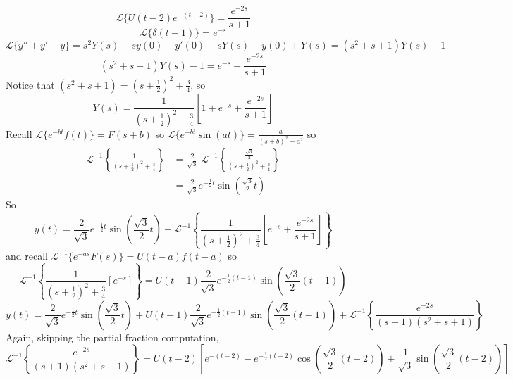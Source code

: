 \documentclass[11pt]{article}
\newcommand{\lap}{\mathcal{L}}
\newcommand{\lapi}{\lap^{-1}}
\begin{document}
		$$ \lap\{ U(t-2) e^{-(t-2)} \} = \frac{e^{-2s}}{s+1} $$
		$$ \lap\{ \delta(t - 1) \} = e^{-s} $$
		$$ \lap\{ y'' + y' + y \} = s^2 Y(s) - sy(0) - y'(0) + s Y(s) - y(0) + Y(s) = (s^2 + s + 1) Y(s) - 1 $$
		$$ (s^2 + s + 1) Y(s) - 1 = e^{-s} + \frac{e^{-2s}}{s+1} $$
	Notice that $(s^2 + s + 1) = \left(s + \frac{1}{2}\right)^2 + \frac{3}{4}$, so
		$$ Y(s) = \frac{1}{\left(s + \frac{1}{2}\right)^2 + \frac{3}{4}} \left[1 + e^{-s} + \frac{e^{-2s}}{s+1} \right] $$
	Recall $\lap\{e^{-bt} f(t)\} = F(s + b)$ so $\lap\{e^{-bt} \sin(at)\} = \frac{a}{(s+b)^2 + a^2}$ so
		\begin{align*}
			\lapi \left\{\frac{1}{\left(s + \frac{1}{2}\right)^2 + \frac{3}{4}} \right\} &= \frac{2}{\sqrt{3}} \; \lapi \left\{\frac{\frac{\sqrt{3}}{2}}{\left(s + \frac{1}{2}\right)^2 + \frac{3}{4}} \right\} \\
				&= \frac{2}{\sqrt{3}} e^{- \frac{1}{2} t} \sin \left(\frac{\sqrt{3}}{2} t \right)
		\end{align*}
	So
		$$ \boxed{y(t) = \frac{2}{\sqrt{3}} e^{- \frac{1}{2} t} \sin \left(\frac{\sqrt{3}}{2} t \right) + \lapi \left\{ \frac{1}{\left(s + \frac{1}{2}\right)^2 + \frac{3}{4}} \left[e^{-s} + \frac{e^{-2s}}{s+1}\right] \right\}} $$
	and recall $\lapi \{e^{-as} F(s)\} = U(t-a) f(t-a)$ so
		$$ \lapi \left\{ \frac{1}{\left(s + \frac{1}{2}\right)^2 + \frac{3}{4}} \left[e^{-s}\right] \right\} = U(t-1) \frac{2}{\sqrt{3}} e^{-\frac{1}{2} (t-1)} \sin \left(\frac{\sqrt{3}}{2} (t-1)\right) $$
		$$ \boxed{y(t) = \frac{2}{\sqrt{3}} e^{- \frac{1}{2} t} \sin \left(\frac{\sqrt{3}}{2} t \right) + U(t-1) \frac{2}{\sqrt{3}} e^{-\frac{1}{2} (t-1)} \sin \left(\frac{\sqrt{3}}{2} (t-1)\right) + \lapi \left\{ \frac{e^{-2s}}{(s+1)(s^2+s+1)} \right\}} $$
	Again, skipping the partial fraction computation,
		$$ \lapi \left\{ \frac{e^{-2s}}{(s+1)(s^2+s+1)} \right\} = U(t-2) \left[ e^{-(t-2)} -  e^{-\frac{1}{2} (t-2)} \cos \left( \frac{\sqrt{3}}{2} (t-2)\right) + \frac{1}{\sqrt{3}}  \sin \left(\frac{\sqrt{3}}{2} (t-2) \right) \right]$$
\end{document}
